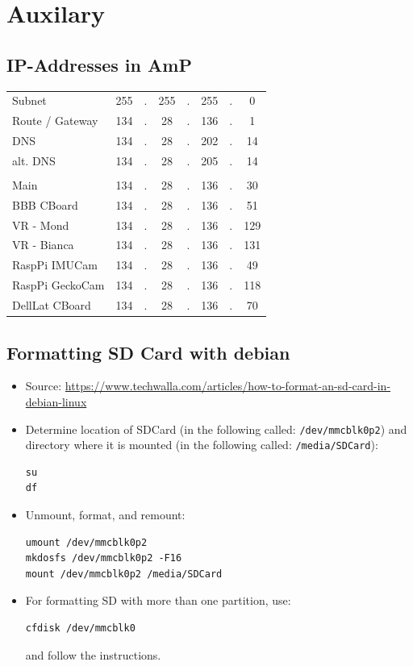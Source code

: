 \documentclass[
	fontsize=10pt
	paper=a4
]{scrartcl}
\begin{document}
\section{Auxilary}


\subsection{IP-Addresses in AmP}
\begin{tabular}{l|ccccccc}
Subnet 		& 255 &.& 255 &.& 255 &.& 0 \\
Route / Gateway 	& 134 &.& 28  &.& 136 &.& 1 \\
DNS	 	& 134 &.& 28  &.& 202 &.& 14 \\
alt. DNS 	& 134 &.& 28  &.& 205 &.& 14 \\ \hline
\\
Main	 	& 134 &.& 28  &.& 136 &.& 30 \\
BBB CBoard 	& 134 &.& 28  &.& 136 &.& 51 \\
VR - Mond 	& 134 &.& 28  &.& 136 &.& 129 \\
VR - Bianca	& 134 &.& 28  &.& 136 &.& 131 \\
RaspPi IMUCam 	& 134 &.& 28  &.& 136 &.& 49 \\
RaspPi GeckoCam	& 134 &.& 28  &.& 136 &.& 118 \\
DellLat CBoard 	& 134 &.& 28  &.& 136 &.& 70 \\


\end{tabular}



\subsection{Formatting SD Card with debian}

\begin{itemize}
\item Source: \url{https://www.techwalla.com/articles/how-to-format-an-sd-card-in-debian-linux}

\item Determine location of SDCard (in the following called: \texttt{/dev/mmcblk0p2}) and directory where it is mounted (in the following called: \texttt{/media/SDCard}):
\begin{lstlisting}
su
df
\end{lstlisting}

\item Unmount, format, and remount:
\begin{lstlisting}
umount /dev/mmcblk0p2
mkdosfs /dev/mmcblk0p2 -F16
mount /dev/mmcblk0p2 /media/SDCard
\end{lstlisting}

\item For formatting SD with more than one partition, use:
\begin{lstlisting}
cfdisk /dev/mmcblk0
\end{lstlisting}
and follow the instructions.
\end{itemize}
\end{document}
